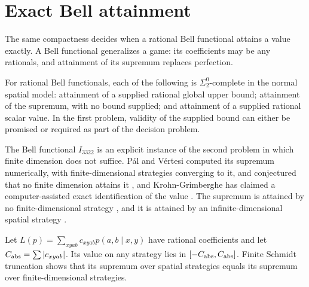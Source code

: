 \section{Exact Bell attainment}\label{sec:bell}
The same compactness decides when a rational Bell functional attains a value exactly. A Bell functional generalizes a game: its coefficients may be any rationals, and attainment of its supremum replaces perfection.

\begin{theorem}\label{thm:bell}
For rational Bell functionals, each of the following is $\Sigma^0_2$-complete in the normal spatial model: attainment of a supplied rational global upper bound; attainment of the supremum, with no bound supplied; and attainment of a supplied rational scalar value. In the first problem, validity of the supplied bound can either be promised or required as part of the decision problem.
\end{theorem}

The Bell functional $I_{3322}$ is an explicit instance of the second problem in which finite dimension does not suffice. P\'al and V\'ertesi computed its supremum numerically, with finite-dimensional strategies converging to it, and conjectured that no finite dimension attains it \cite{PalVertesi}, and Krohn-Grimberghe has claimed a computer-assisted exact identification of the value \cite{KrohnGrimberghe}. The supremum is attained by no finite-dimensional strategy \cite{Pauwels,Coladangelo3322,Douglas3322}, and it is attained by an infinite-dimensional spatial strategy \cite{Coladangelo3322,Douglas3322}.

Let $L(p)=\sum_{xyab}c_{xyab}p(a,b\mid x,y)$ have rational coefficients and let $C_{\rm abs}=\sum|c_{xyab}|$. Its value on any strategy lies in $[-C_{\rm abs},C_{\rm abs}]$. Finite Schmidt truncation shows that its supremum over spatial strategies equals its supremum over finite-dimensional strategies.

